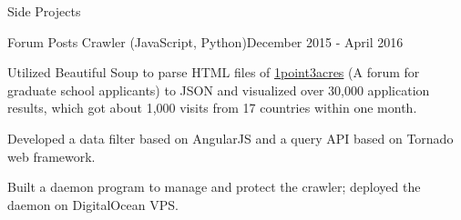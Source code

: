 \documentclass{resume} %
\begin{document}
\begin{rSection}{Side Projects}

\begin{rSubsection}{Forum Posts Crawler (JavaScript, Python)}{December 2015 - April 2016}{}{}
\item Utilized Beautiful Soup to parse HTML files of \href{http://1point3acres.com/bbs/forum.php}{1point3acres} (A forum for graduate school applicants) to JSON and visualized over 30,000 application results, which got about 1,000 visits from 17 countries within one month.
\item Developed a data filter based on AngularJS and a query API based on Tornado web framework.
\item Built a daemon program to manage and protect the crawler; deployed the daemon on DigitalOcean VPS.
\end{rSubsection}


%


\end{rSection}
\end{document}
